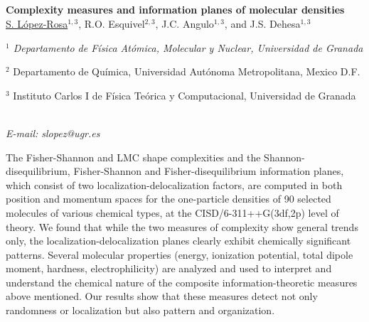 \newpage
\setcounter{figure}{0}
\begin{center}
\section*{}
{\bf \Large
Complexity measures and information planes of molecular densities
}
\\
\vspace{0.5cm}
\underline{S. López-Rosa}$^{1,3}$, R.O. Esquivel$^{2,3}$, J.C. Angulo$^{1,3}$, and J.S. Dehesa$^{1,3}$
\\
\vspace{0.5cm}
{\it 
$^{1}$ Departamento de Física Atómica, Molecular y Nuclear, Universidad de Granada

$^{2}$ Departamento de Química, Universidad Autónoma Metropolitana, Mexico D.F.

$^{3}$ Instituto Carlos I de Física Teórica y Computacional, Universidad de Granada
}
\\
\vspace{0.5cm}
{\it E-mail: slopez@ugr.es}
\\
\vspace{0.5cm}
\end{center}
The Fisher-Shannon and LMC shape complexities and the Shannon-disequilibrium, Fisher-Shannon
and Fisher-disequilibrium information planes, which consist of two localization-delocalization factors,
are computed in both position and momentum spaces for the one-particle densities of 90 selected molecules of
various chemical types, at the CISD/6-311++G(3df,2p) level of theory.
We found that while the two measures of complexity show general trends only, the localization-delocalization
planes clearly exhibit chemically significant patterns. Several molecular properties
(energy, ionization potential, total dipole moment, hardness, electrophilicity) are analyzed and used
to interpret and understand the chemical nature of the composite information-theoretic measures
above mentioned. Our results show that these measures detect not only randomness or localization
but also pattern and organization.


\newpage
\setcounter{figure}{0}
